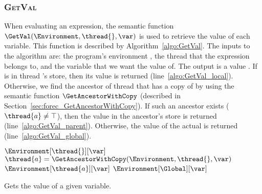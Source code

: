 \subsubsection{\textsc{GetVal}}
\label{sec:forec_GetVal}
When evaluating an expression, the semantic function
$\GetVal(\Environment, \thread{}, \var)$ is used 
to retrieve the value of each variable. 
This function is described by Algorithm~\ref{algo:GetVal}. 
The inputs to the algorithm are: the program's environment 
\Environment{}, the thread \thread{} that the expression 
belongs to, and the variable \var{} that we want the value 
of. The output is a value \val{}. If \var{} is in thread 
\thread{}'s store, then its value is returned 
(line~\ref{algo:GetVal_local}). Otherwise, we find the ancestor of
thread \thread{} that has a copy of \var{} by using the
semantic function $\GetAncestorWithCopy$ 
(described in Section~\ref{sec:forec_GetAncestorWithCopy}). 
If such an ancestor exists ($\thread{a} \neq \top$), then
the value in the ancestor's store is returned (line~\ref{algo:GetVal_parent}). 
Otherwise, the value of the actual \var{} is returned
(line~\ref{algo:GetVal_global}).

\begin{algorithm}[t]
	\begin{algorithmic}[1]
		\Function{$\GetVal$}{\Environment{}, \thread{}, \var{}}
			\If {$\var \in \Environment[\thread{}]$}	
				\State \Return $\Environment[\thread{}][\var]$							\label{algo:GetVal_local}
			\Else
				\State $\thread{a} = \GetAncestorWithCopy(\Environment, \thread{}, \var)$
					\State \Return $\Environment[\thread{a}][\var]$						\label{algo:GetVal_parent}
				\Else
					\State \Return $\Environment[\Global][\var]$						\label{algo:GetVal_global}
				\EndIf
			\EndIf
		\EndFunction
	\end{algorithmic}
	
	\caption{Gets the value of a given variable.}
	\label{algo:GetVal}
\end{algorithm}


